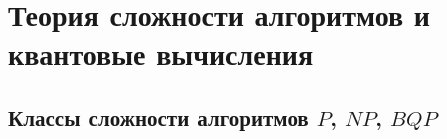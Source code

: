 \section{Теория сложности алгоритмов и квантовые вычисления}

\subsection{Классы сложности алгоритмов $P$, $NP$, $BQP$ }
